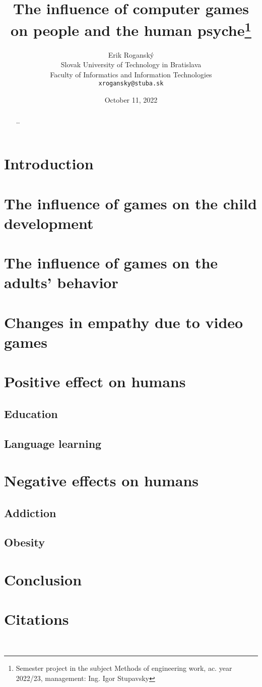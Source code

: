 \documentclass[10pt,twoside,slovak,a4paper]{article}
\title{The influence of computer games on people and the human psyche\thanks{Semester project in the subject Methods of engineering work, ac. year 2022/23, management: Ing. Igor Stupavsky}}
\author{Erik Roganský\\[2pt]
	{\small Slovak University of Technology in Bratislava}\\
	{\small Faculty of Informatics and Information Technologies}\\
	{\small \texttt{xrogansky@stuba.sk}}
	}
\date{\small October 11, 2022}
\begin{document}
\maketitle

\begin{abstract}
\ldots
\end{abstract}



\section{Introduction}


\section{The influence of games on the child development} \label{part1}


\section{The influence of games on the adults' behavior} \label{part2}


\section{Changes in empathy due to video games} \label{part3}


\section{Positive effect on humans} \label{part3}
\subsection{Education}
\subsection{Language learning}


\section{Negative effects on humans}
\subsection{Addiction}
\subsection{Obesity}


\section{Conclusion} \label{conclusion}

\section{Citations} \label{cit} 
~\cite{school,behavior,education,empathy,problems,poz-neg-sol,language}





\end{document}

